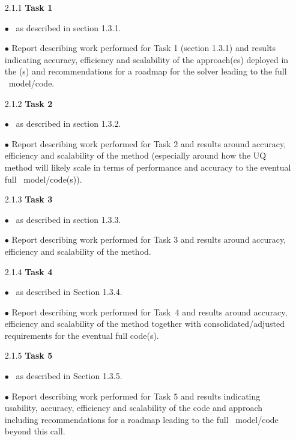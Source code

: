 


\begin{itemize}
\item[2.1.1] \textbf{Task 1 }

\item[$\bullet$] \Papp \ as described in section 1.3.1. 

\item[$\bullet$] Report describing work performed for Task 1 (section 1.3.1) and results 
indicating accuracy, efficiency and scalability of the approach(es) deployed in 
the \Papp (s) and recommendations for a roadmap for the solver leading to the 
full \nep \   model/code. 

\item[2.1.2] \textbf{Task 2 }

\item[$\bullet$] \Papp \ as described in section 1.3.2. 

\item[$\bullet$] Report describing work performed for Task 2 and results around accuracy, 
efficiency and scalability of the method (especially around how the UQ method will 
likely scale in terms of performance and accuracy to the eventual full \nep \   
model/code(s)). 

\item[2.1.3] \textbf{Task 3 }

\item[$\bullet$] \Papp \ as described in section 1.3.3. 

\item[$\bullet$] Report describing work performed for Task 3 and results around accuracy, 
efficiency and scalability of the method. 

\item[2.1.4] \textbf{Task 4 }

\item[$\bullet$] \Papp \ as described in Section 1.3.4. 

\item[$\bullet$] Report describing work performed for Task~4 and results around accuracy, 
efficiency and scalability of the method together with consolidated/adjusted requirements 
for the eventual full code(s). 

\item[2.1.5] \textbf{Task 5 }

\item[$\bullet$] \Papp \  as described in Section 1.3.5. 

\item[$\bullet$] Report describing work performed for Task 5 and results indicating usability, 
accuracy, efficiency and scalability of the code and approach including recommendations 
for a roadmap leading to the full \nep \   model/code beyond this call.

\end{itemize}
